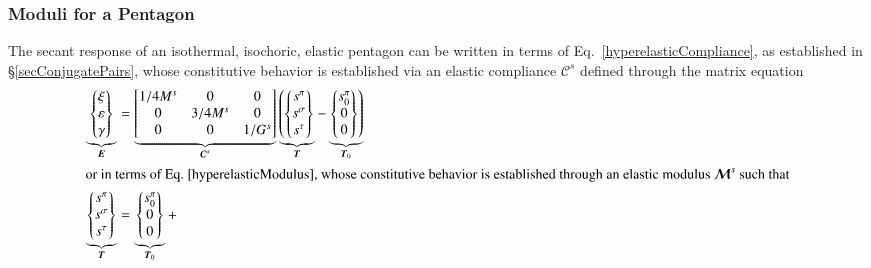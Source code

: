 \subsubsection{Moduli for a Pentagon}

The secant response of an isothermal, isochoric, elastic pentagon can be written in terms of Eq.~\ref{hyperelasticCompliance}, as established in \S\ref{secConjugatePairs}, whose constitutive behavior is established via an elastic compliance $\boldsymbol{\mathcal{C}}^s$ defined through the matrix equation
\begin{subequations}
    \label{pentagonCEs}
    \begin{align}
    \underbrace{ \left\{ \begin{matrix} 
        \xi \\ \varepsilon \\ \gamma \end{matrix} 
    \right\} }_{\boldsymbol{E}} & =
    \underbrace{ \begin{bmatrix} 
        1/4M^s & 0 & 0 \\ 0 & 3/4M^s & 0 \\ 0 & 0 & 1/G^s 
    \end{bmatrix} }_{\boldsymbol{\mathcal{C}}^s} 
    \underbrace{ \left( \left\{ \begin{matrix}
        s^{\pi} \\ s^{\sigma} \\ s^{\tau}
    \end{matrix} \right\} \right. }_{\boldsymbol{T}} - 
    \underbrace{ \left. \left\{ \begin{matrix}
    s^{\pi}_0 \\ 0 \\ 0
    \end{matrix} \right\} \right) }_{\boldsymbol{T}_0} 
    \label{pentagonSecantCompliance} \\
    \intertext{or in terms of Eq.~\ref{hyperelasticModulus}, whose constitutive behavior is established through an elastic modulus $\boldsymbol{\mathcal{M}}^s$ such that}
    \underbrace{ \left\{ \begin{matrix}
    s^{\pi} \\ s^{\sigma} \\ s^{\tau}
    \end{matrix} \right\} }_{\boldsymbol{T}}  & =
    \underbrace{ \left\{ \begin{matrix}
    s^{\pi}_0 \\ 0 \\ 0
    \end{matrix} \right\} }_{\boldsymbol{T}_0} +

\end{align}
\end{subequations}
